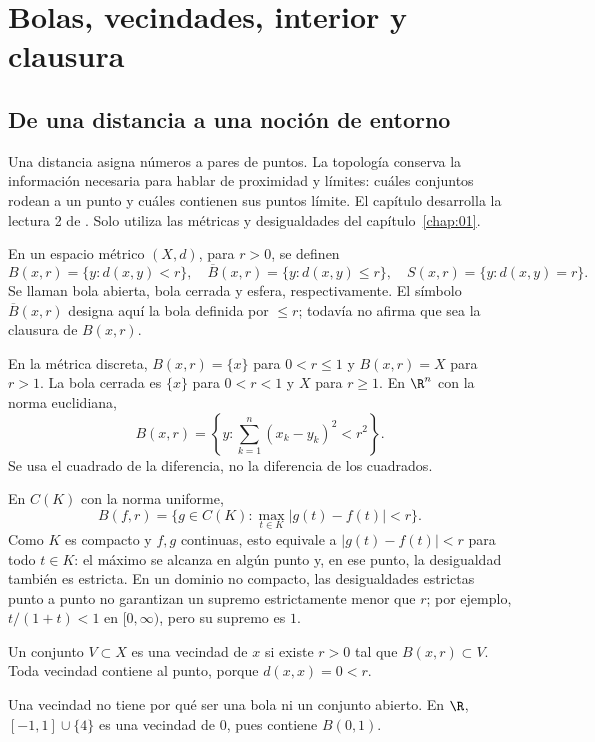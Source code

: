 \chapter{Bolas, vecindades, interior y clausura}\label{chap:02}
\section{De una distancia a una noción de entorno}
Una distancia asigna números a pares de puntos. La topología conserva la información necesaria para hablar de proximidad y límites: cuáles conjuntos rodean a un punto y cuáles contienen sus puntos límite. El capítulo desarrolla la lectura 2 de \cite{valencia}. Solo utiliza las métricas y desigualdades del capítulo~\ref{chap:01}.

\begin{definicion}\label{ch02:bolas}
En un espacio métrico $(X,d)$, para $r>0$, se definen
\[
B(x,r)=\{y:d(x,y)<r\},\quad
\overline B(x,r)=\{y:d(x,y)\le r\},\quad
S(x,r)=\{y:d(x,y)=r\}.
\]
Se llaman bola abierta, bola cerrada y esfera, respectivamente. El símbolo $\overline B(x,r)$ designa aquí la bola definida por $\le r$; todavía no afirma que sea la clausura de $B(x,r)$.
\end{definicion}
En la métrica discreta, $B(x,r)=\{x\}$ para $0<r\le1$ y $B(x,r)=X$ para $r>1$. La bola cerrada es $\{x\}$ para $0<r<1$ y $X$ para $r\ge1$. En $\R^n$ con la norma euclidiana,
\[
B(x,r)=\left\{y:\sum_{k=1}^n(x_k-y_k)^2<r^2\right\}.
\]
Se usa el cuadrado de la diferencia, no la diferencia de los cuadrados.

En $C(K)$ con la norma uniforme,
\[
B(f,r)=\{g\in C(K):\max_{t\in K}|g(t)-f(t)|<r\}.
\]
Como $K$ es compacto y $f,g$ continuas, esto equivale a $|g(t)-f(t)|<r$ para todo $t\in K$: el máximo se alcanza en algún punto y, en ese punto, la desigualdad también es estricta. En un dominio no compacto, las desigualdades estrictas punto a punto no garantizan un supremo estrictamente menor que $r$; por ejemplo, $t/(1+t)<1$ en $[0,\infty)$, pero su supremo es $1$.

\begin{definicion}\label{ch02:vecindad}
Un conjunto $V\subset X$ es una vecindad de $x$ si existe $r>0$ tal que $B(x,r)\subset V$. Toda vecindad contiene al punto, porque $d(x,x)=0<r$.
\end{definicion}
Una vecindad no tiene por qué ser una bola ni un conjunto abierto. En $\R$, $[-1,1]\cup\{4\}$ es una vecindad de $0$, pues contiene $B(0,1)$.

